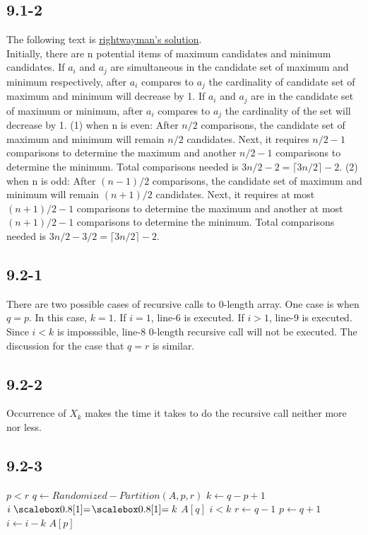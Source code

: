 \documentclass{book}
\begin{document}
\begin{CJK}{UTF8}{gkai}
\subsection*{9.1-2}
The following text is 
\href{http://rightwayman.blogspot.com/2010/12/algo-exercise-91.html}{rightwayman's 
solution}. \\
Initially, there are n potential items of maximum candidates and minimum 
candidates. If $a_i$ and $a_j$ are simultaneous in the candidate set of maximum 
and minimum respectively, after $a_i$ compares to $a_j$ the cardinality of 
candidate set of maximum and minimum will decrease by 1. If $a_i$ and $a_j$ are 
in the candidate set of maximum or minimum, after $a_i$ compares to $a_j$ the 
cardinality of the set will decrease by 1.
(1) when n is even:
After $n/2$ comparisons, the candidate set of maximum and minimum will remain 
$n/2$ candidates. Next, it requires $n/2 - 1$ comparisons to determine the 
maximum and another $n/2 - 1$ comparisons to determine the minimum. Total 
comparisons needed is $3n/2 - 2 = \lceil 3n/2 \rceil -2$.
(2) when n is odd:
After $(n-1)/2$ comparisons, the candidate set of maximum and minimum will 
remain $(n+1)/2$ candidates. Next, it requires at most $(n+1)/2 - 1$ comparisons 
to determine the maximum and another at most $(n+1)/2 - 1$ comparisons to 
determine the minimum. Total comparisons needed is $3n/2 - 3/2 = \lceil 3n/2 
\rceil -2$.

\subsection*{9.2-1} There are two possible cases of recursive calls to 0-length 
array. One case is when $q = p$. In this case, $k = 1$. If $i = 1$, line-6 is 
executed.  If $i > 1$, line-9 is executed. Since $i < k$ is imposssible, line-8 
0-length recursive call will not be executed. The discussion for the case that 
$q = r$ is similar.

\subsection*{9.2-2} Occurrence of $X_k$ makes the time it takes to do the recursive 
call neither more nor less.

\subsection*{9.2-3}
\begin{codebox}
\li \While $p < r$
\li \Do $q \gets Randomized-Partition(A,p,r)$
\li $k \gets q-p+1$
\li \If $i \isequal k$
\li \Then \Return $A[q]$
\li \ElseIf $i < k$
\li \Then $r \gets q-1$
\li \Else $p \gets q+1$
\li $i \gets i-k$
\End
\End
\li \Return $A[p]$
\end{codebox}


\end{CJK}
\end{document}
